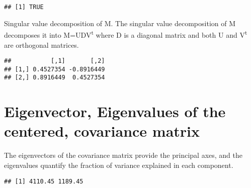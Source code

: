 \documentclass[]{article}
\newenvironment{Shaded}{\begin{snugshade}}{\end{snugshade}}
\newcommand{\KeywordTok}[1]{\textcolor[rgb]{0.13,0.29,0.53}{\textbf{#1}}}
\newcommand{\StringTok}[1]{\textcolor[rgb]{0.31,0.60,0.02}{#1}}
\newcommand{\CommentTok}[1]{\textcolor[rgb]{0.56,0.35,0.01}{\textit{#1}}}
\newcommand{\OperatorTok}[1]{\textcolor[rgb]{0.81,0.36,0.00}{\textbf{#1}}}
\newcommand{\NormalTok}[1]{#1}
\begin{document}
\begin{verbatim}
## [1] TRUE
\end{verbatim}

Singular value decomposition of M. The singular value decomposition of M
decomposes it into M=UDV\textsuperscript{t} where D is a diagonal matrix
and both U and V\textsuperscript{t} are orthogonal matrices.

\begin{Shaded}
\end{Shaded}

\begin{verbatim}
##           [,1]       [,2]
## [1,] 0.4527354 -0.8916449
## [2,] 0.8916449  0.4527354
\end{verbatim}

\hypertarget{eigenvector-eigenvalues-of-the-centered-covariance-matrix}{%
\section{Eigenvector, Eigenvalues of the centered, covariance
matrix}\label{eigenvector-eigenvalues-of-the-centered-covariance-matrix}}

The eigenvectors of the covariance matrix provide the principal axes,
and the eigenvalues quantify the fraction of variance explained in each
component.

\begin{Shaded}
\end{Shaded}

\begin{verbatim}
## [1] 4110.45 1189.45
\end{verbatim}
\end{document}
